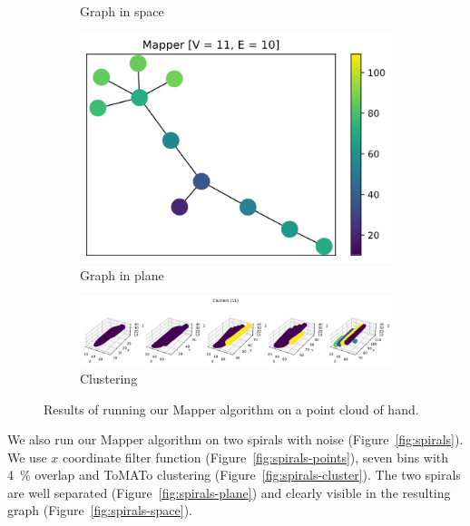 \documentclass{article}
\begin{document}
\begin{figure}[H]
\begin{subfigure}[c]{0.3\columnwidth}
        \caption{Graph in space}
        \label{fig:hand-space}
    \end{subfigure}
    \begin{subfigure}[c]{0.3\columnwidth}
        \centering
        \includegraphics[width=\textwidth]{hand-graph-2d}
        \caption{Graph in plane}
        \label{fig:hand-plane}
    \end{subfigure}
    \begin{subfigure}[c]{0.9\columnwidth}
        \centering
        \includegraphics[width=\textwidth]{hand-clusters}
        \caption{Clustering}
        \label{fig:hand-cluster}
    \end{subfigure}
    \caption{Results of running our Mapper algorithm on a point cloud of hand.}
    \label{fig:hand}
\end{figure}

We also run our Mapper algorithm on two spirals with noise (Figure~\ref{fig:spirals}).
We use $x$ coordinate filter function (Figure~\ref{fig:spirals-points}), seven bins with 4~\% overlap and ToMATo clustering (Figure~\ref{fig:spirals-cluster}).
The two spirals are well separated (Figure~\ref{fig:spirals-plane}) and clearly visible in the resulting graph (Figure~\ref{fig:spirals-space}).
\end{document}
